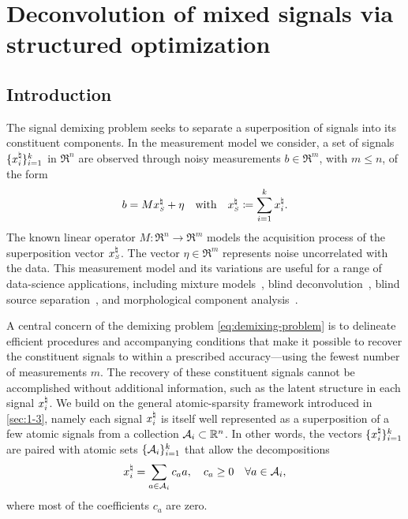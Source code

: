 \chapter{Deconvolution of mixed signals via structured optimization}
\label{ch:App-Sig-Demix}

\section{Introduction} 

The signal demixing problem seeks to separate a superposition of signals into its constituent components. In the measurement model we consider, a set of signals $\{x_i^{\natural}\}_{i=1}^k$ in $\Re^n$ are observed through noisy
measurements $b\in\Re^m$, with $m\le n$, of the form
\begin{equation}\label{eq:demixing-problem}
  b = Mx_{\scriptscriptstyle S}^\natural + \eta \hbox{\quad with\quad} x_{\scriptscriptstyle S}^\natural\coloneqq \sum\limits_{i = 1}^k x_i^{\natural}.
\end{equation}
The known linear operator $M:\Re^n \rightarrow \Re^m$ models the acquisition process of the superposition vector $x_{\scriptscriptstyle S}^\natural$. The vector $\eta\in \Re^m$ represents noise uncorrelated with the data. This measurement model and its variations are useful for a range of data-science applications, including mixture models~\citep{araki2009blind,quiros2012dependent}, blind deconvolution~\citep{ahmed2013blind}, blind source separation~\citep{chan2008convex}, and morphological component analysis~\citep{bobin2007morphological}.

A central concern of the demixing problem \eqref{eq:demixing-problem} is to delineate efficient procedures and accompanying conditions that make it possible to recover the constituent signals to within a prescribed accuracy---using the fewest number of measurements $m$. The recovery of these constituent signals cannot be accomplished without additional information, such as the latent structure in each signal $x_i^{\natural}$. We build on the general atomic-sparsity framework introduced in \autoref{sec:1-3}, namely each signal $x_i^{\natural}$ is itself well represented as a superposition of a few atomic signals from a collection  $\mathcal{A}_i\subset\mathbb{R}^n$. In other words, the vectors $\{x_i^{\natural}\}_{i=1}^k$ are paired with atomic sets $\{\mathcal{A}_i\}_{i=1}^k$ that allow the decompositions
\begin{equation} \label{eq:decomposition}
  x_i^{\natural} = \sum_{a\in \mathcal{A}_i}c_a a, \quad c_a\geq 0\quad \forall a \in \mathcal{A}_i,
\end{equation}
where most of the coefficients $c_a$ are zero.


